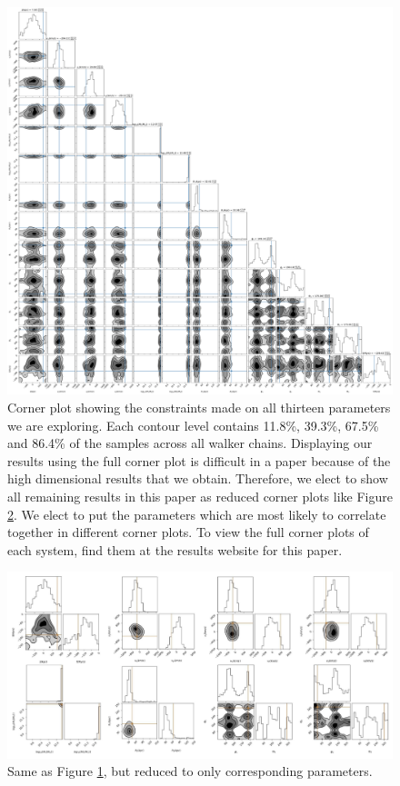 \begin{figure}
    \centering
    \includegraphics[width=\textwidth]{Chapter1/figures/Arp240-full-corner.pdf}
    \caption{Corner plot showing the constraints made on all thirteen parameters we are exploring. Each contour level contains 11.8\%, 39.3\%, 67.5\% and 86.4\% of the samples across all walker chains. Displaying our results using the full corner plot is difficult in a paper because of the high dimensional results that we obtain. Therefore, we elect to show all remaining results in this paper as reduced corner plots like Figure \ref{fig:arp240_corner_plot}. We elect to put the parameters which are most likely to correlate together in different corner plots. To view the full corner plots of each system, find them at the results website for this paper.}
    \label{fig:corner_plot}
\end{figure}

\begin{figure}
    \centering
    \includegraphics[width=\textwidth]{Chapter1/figures/Arp240-red-corner.pdf}
    \caption{Same as Figure \ref{fig:corner_plot}, but reduced to only corresponding parameters.}
    \label{fig:arp240_corner_plot}
\end{figure}

